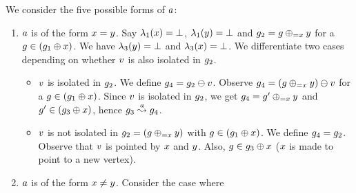 \begin{enumerate}
We consider
the five possible forms of $a$:
%
\begin{enumerate}
\item $a$ is of the form $x=y$.
%
%
%
%
%
%
%
%
Say 
$\lambda_1(x)=\bot$, 
$\lambda_1(y)=\bot$
and
$g_2=g\oplus_{={x}}{y}$ for a
$g\in\left(g_1\oplus{\ensuremath{x}}\right)$.
%
We have $\lambda_3(y)=\bot$ and 
$\lambda_3(x)=\bot$.
%
We differentiate two cases depending 
on whether $v$ is also isolated
in $g_2$.
%
\begin{itemize}
\item 
$v$ is isolated in $g_2$.
%
We define $g_4=g_2\ominus{\ensuremath{v}}$.
%
Observe $g_4=
(g\oplus_{={x}}{y})\ominus{\ensuremath{v}}$ 
for a
$g\in\left(g_1\oplus{\ensuremath{x}}\right)$.
%
Since $v$ is isolated in $g_2$, 
we get 
$g_4
=g'\oplus_{={x}}{y}$
and 
$g'
\in(g_3\oplus{\ensuremath{x}})$, hence
$g_3\stackrel{a}{\leadsto}g_4$.
\item $v$ is not isolated in 
$g_2=(g\oplus_{={x}}{y})$ 
with
$g\in\left(g_1\oplus{\ensuremath{x}}\right)$.
%
We define $g_4=g_2$.
%
Observe that $v$ is 
pointed by $x$ and $y$.
Also, $g\in g_3\oplus{\ensuremath{x}}$ 
($x$ is made to point to a new vertex).
\end{itemize}
%
%
\item $a$ is of the form $x\neq y$.
Consider the case where 

\end{enumerate}
\end{enumerate}
